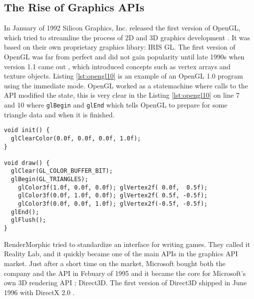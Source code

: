 
\subsection{The Rise of Graphics \acs{API}s} 

In January of 1992 Silicon Graphics, Inc. released the first version of OpenGL, which tried to streamline the process of 2D and 3D graphics development \cite{segal1994opengl}.
It was based on their own proprietary graphics libary: \gls{IRIS GL}.
The first version of OpenGL was far from perfect and did not gain popularity until late 1990s when version 1.1 came out \cite{kronos????history}, which introduced concepts such as vertex arrays and texture objects.
Listing \ref{lst:opengl10} is an example of an OpenGL 1.0 program using the immediate mode.
OpenGL worked as a statemachine where calls to the \gls{API} modified the state, this is very clear in the Listing \ref{lst:opengl10} on line 7 and 10 where \texttt{glBegin} and \texttt{glEnd} which tells OpenGL to prepare for some triangle data and when it is finished.

\begin{lstlisting}[language={[ANSI]C}, caption={OpenGL 1.0 program written in C, that renders a triangle with different colors on the points, and linear interpolation between the colors. This method uses the fixed pipeline to render the triangle. A method which has been deprecated since OpenGL 3.0.}, label={lst:opengl10}]
void init() {
  glClearColor(0.0f, 0.0f, 0.0f, 1.0f);
}

void draw() {
  glClear(GL_COLOR_BUFFER_BIT);
  glBegin(GL_TRIANGLES);
    glColor3f(1.0f, 0.0f, 0.0f); glVertex2f( 0.0f,  0.5f);
    glColor3f(0.0f, 1.0f, 0.0f); glVertex2f( 0.5f, -0.5f);
    glColor3f(0.0f, 0.0f, 1.0f); glVertex2f(-0.5f, -0.5f);
  glEnd();
  glFlush();
}
\end{lstlisting}

RenderMorphic tried to standardize an interface for writing games.
They called it Reality Lab, and it quickly became one of the main \glspl{API} in the graphics \gls{API} market. 
Just after a short time on the market, Microsoft bought both the company and the \gls{API} in Febuary of 1995 and it became the core for Microsoft's own 3D rendering \gls{API} \cite{1997crushed}; Direct3D.
The first version of Direct3D shipped in June 1996 with DirectX 2.0 \cite{wikipedia????directx}. 

